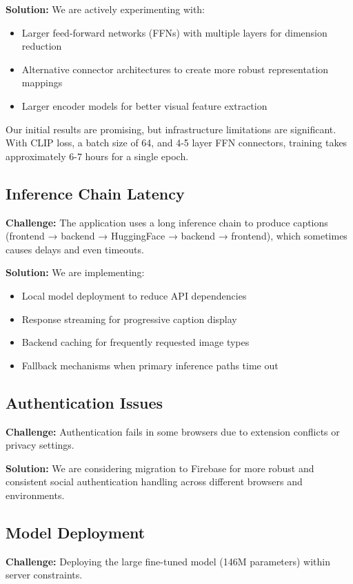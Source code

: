 \documentclass[12pt,a4paper]{report}
\begin{document}
\textbf{Solution:} We are actively experimenting with:
\begin{itemize}
    \item Larger feed-forward networks (FFNs) with multiple layers for dimension reduction
    \item Alternative connector architectures to create more robust representation mappings
    \item Larger encoder models for better visual feature extraction
\end{itemize}

Our initial results are promising, but infrastructure limitations are significant. With CLIP loss, a batch size of 64, and 4-5 layer FFN connectors, training takes approximately 6-7 hours for a single epoch.

\subsection{Inference Chain Latency}
\textbf{Challenge:} The application uses a long inference chain to produce captions (frontend → backend → HuggingFace → backend → frontend), which sometimes causes delays and even timeouts.

\textbf{Solution:} We are implementing:
\begin{itemize}
    \item Local model deployment to reduce API dependencies
    \item Response streaming for progressive caption display
    \item Backend caching for frequently requested image types
    \item Fallback mechanisms when primary inference paths time out
\end{itemize}

\subsection{Authentication Issues}
\textbf{Challenge:} Authentication fails in some browsers due to extension conflicts or privacy settings.

\textbf{Solution:} We are considering migration to Firebase for more robust and consistent social authentication handling across different browsers and environments.

\subsection{Model Deployment}
\textbf{Challenge:} Deploying the large fine-tuned model (146M parameters) within server constraints.
\end{document}
